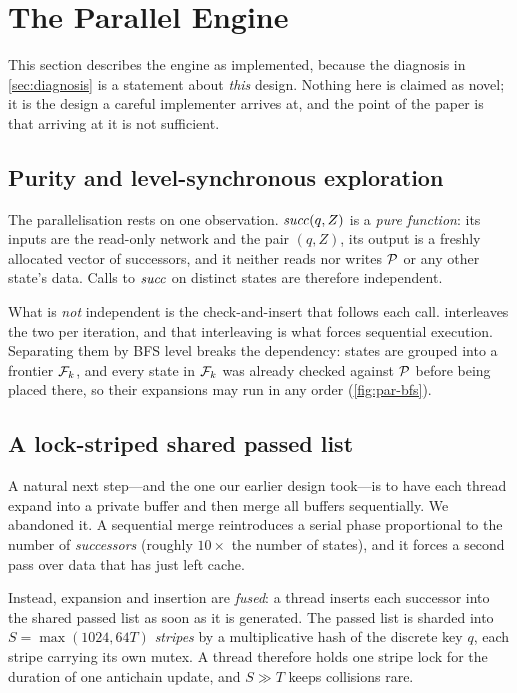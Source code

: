 \section{The Parallel Engine}\label{sec:engine}

This section describes the engine as implemented, because the diagnosis in
\cref{sec:diagnosis} is a statement about \emph{this} design.  Nothing here is
claimed as novel; it is the design a careful implementer arrives at, and the
point of the paper is that arriving at it is not sufficient.

\subsection{Purity and level-synchronous exploration}

The parallelisation rests on one observation.  $\mathit{succ}(q,Z)$ is a \emph{pure
function}: its inputs are the read-only network and the pair $(q,Z)$, its output
is a freshly allocated vector of successors, and it neither reads nor writes
$\mathcal{P}$ or any other state's data.  Calls to $\mathit{succ}$ on distinct states are
therefore independent.

What is \emph{not} independent is the check-and-insert that follows each call.
 interleaves the two per iteration, and that interleaving is what
forces sequential execution.  Separating them by BFS level breaks the
dependency: states are grouped into a frontier $\mathcal{F}_k$, and every state in
$\mathcal{F}_k$ was already checked against $\mathcal{P}$ before being placed there, so
their expansions may run in any order (\cref{fig:par-bfs}).

\subsection{A lock-striped shared passed list}

A natural next step---and the one our earlier design took---is to have each
thread expand into a private buffer and then merge all buffers sequentially.  We
abandoned it.  A sequential merge reintroduces a serial phase proportional to the
number of \emph{successors} (roughly $10\times$ the number of states), and it
forces a second pass over data that has just left cache.

Instead, expansion and insertion are \emph{fused}: a thread inserts each
successor into the shared passed list as soon as it is generated.  The passed
list is sharded into $S = \max(1024, 64T)$ \emph{stripes} by a multiplicative
hash of the discrete key $q$, each stripe carrying its own mutex.  A thread
therefore holds one stripe lock for the duration of one antichain update, and
$S \gg T$ keeps collisions rare.

